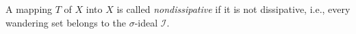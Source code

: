 A mapping $T$ of $X$ into $X$ is called \textit{nondissipative} if it is not dissipative, i.e., every wandering set belongs to the $\sigma$-ideal $\mathcal{I}$.
